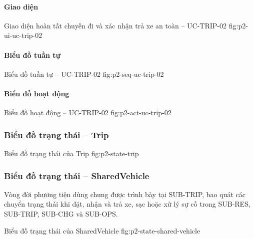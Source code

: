 \par\medskip
\noindent\begin{minipage}{\linewidth}
\paragraph{Giao diện}
  {Giao diện hoàn tất chuyến đi và xác nhận trả xe an toàn -- UC-TRIP-02}
  {fig:p2-ui-uc-trip-02}
  {}
\end{minipage}\par

\clearpage
\paragraph{Biểu đồ tuần tự}
  {Biểu đồ tuần tự -- UC-TRIP-02}
  {fig:p2-seq-uc-trip-02}

\clearpage
\paragraph{Biểu đồ hoạt động}
  {Biểu đồ hoạt động -- UC-TRIP-02}
  {fig:p2-act-uc-trip-02}

\clearpage

\subsubsection{Biểu đồ trạng thái -- Trip}

  {Biểu đồ trạng thái của Trip}
  {fig:p2-state-trip}

\clearpage
\subsubsection{Biểu đồ trạng thái -- SharedVehicle}

Vòng đời phương tiện dùng chung được trình bày tại SUB-TRIP, bao quát các chuyển trạng thái khi đặt, nhận và trả xe, sạc hoặc xử lý sự cố trong SUB-RES, SUB-TRIP, SUB-CHG và SUB-OPS.

  {Biểu đồ trạng thái của SharedVehicle}
  {fig:p2-state-shared-vehicle}

\clearpage
